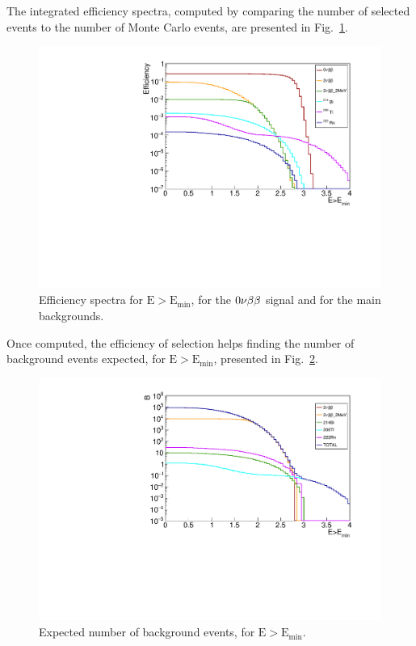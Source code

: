 The integrated efficiency spectra, computed by comparing the number of selected events to the number of Monte Carlo events, are presented in Fig.~\ref{fig:sensitivity_efficiency_spectra}.
\begin{figure}[h]
  \centering
  \includegraphics[width=1.1\textwidth]{Sensitivity/fig_sensitivity/efficiency_spectrum_with_B_82Se.pdf}
  \caption{Efficiency spectra for $\text{E}>\text{E}_{\text{min}}$, for the $0\nu\beta\beta$ signal and for the main backgrounds.
    \label{fig:sensitivity_efficiency_spectra}}
\end{figure}
Once computed, the efficiency of selection helps finding the number of background events expected, for $\text{E}>\text{E}_{\text{min}}$, presented in Fig.~\ref{fig:sensitivity_Nbkg_spectra}.
\begin{figure}[h]
  \centering
  \includegraphics[width=1.1\textwidth]{Sensitivity/fig_sensitivity/Nbackground_spectrum_with_B_82Se.pdf}
  \caption{Expected number of background events, for $\text{E}>\text{E}_{\text{min}}$.
    \label{fig:sensitivity_Nbkg_spectra}}
\end{figure}


